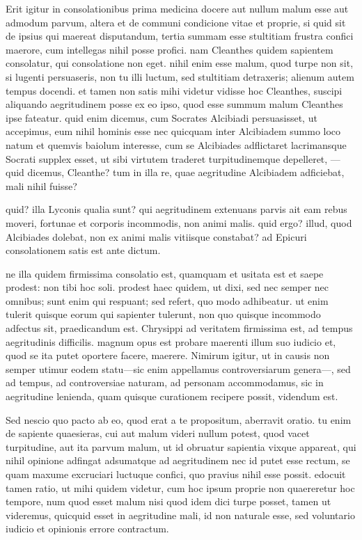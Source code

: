  Erit igitur in consolationibus prima medicina docere aut nullum malum esse aut admodum parvum, altera et de communi condicione vitae et proprie, si quid sit de ipsius qui maereat disputandum, tertia summam esse stultitiam frustra confici maerore, cum intellegas nihil posse profici. nam Cleanthes quidem sapientem consolatur, qui consolatione non eget. nihil enim esse malum, quod turpe non sit, si lugenti persuaseris, non tu illi luctum, sed stultitiam detraxeris; alienum autem tempus docendi. et tamen non satis mihi videtur vidisse hoc Cleanthes, suscipi aliquando aegritudinem posse ex eo ipso, quod esse summum malum Cleanthes ipse fateatur. quid enim dicemus, cum Socrates Alcibiadi persuasisset, ut accepimus, eum nihil hominis esse nec quicquam inter Alcibiadem summo loco natum et quemvis baiolum interesse, cum se Alcibiades adflictaret lacrimansque Socrati supplex esset, ut sibi virtutem traderet turpitudinemque depelleret, —quid dicemus, Cleanthe? tum in illa re, quae aegritudine Alcibiadem adficiebat, mali nihil fuisse?

 quid? illa Lyconis qualia sunt? qui aegritudinem extenuans parvis ait eam rebus moveri, fortunae et corporis incommodis, non animi malis. quid ergo? illud, quod Alcibiades dolebat, non ex animi malis vitiisque constabat? ad Epicuri consolationem satis est ante dictum.

 ne illa quidem firmissima consolatio est, quamquam et usitata est et saepe prodest: non tibi hoc soli. prodest haec quidem, ut dixi, sed nec semper nec omnibus; sunt enim qui respuant; sed refert, quo modo adhibeatur. ut enim tulerit quisque eorum qui sapienter tulerunt, non quo quisque incommodo adfectus sit, praedicandum est. Chrysippi ad veritatem firmissima est, ad tempus aegritudinis difficilis. magnum opus est probare maerenti illum suo iudicio et, quod se ita putet oportere facere, maerere. Nimirum igitur, ut in causis non semper utimur eodem statu—sic enim appellamus controversiarum genera—, sed ad tempus, ad controversiae naturam, ad personam accommodamus, sic in aegritudine lenienda, quam quisque curationem recipere possit, videndum est.

 Sed nescio quo pacto ab eo, quod erat a te propositum, aberravit oratio. tu enim de sapiente quaesieras, cui aut malum videri nullum potest, quod vacet turpitudine, aut ita parvum malum, ut id obruatur sapientia vixque appareat, qui nihil opinione adfingat adsumatque ad aegritudinem nec id putet esse rectum, se quam maxume excruciari luctuque confici, quo pravius nihil esse possit. edocuit tamen ratio, ut mihi quidem videtur, cum hoc ipsum proprie non quaereretur hoc tempore, num quod esset malum nisi quod idem dici turpe posset, tamen ut videremus, quicquid esset in aegritudine mali, id non naturale esse, sed voluntario iudicio et opinionis errore contractum.

